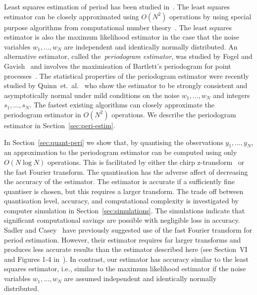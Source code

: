 \documentclass[10pt,twocolumn,twoside]{IEEEtran}
\begin{document}
Least squares estimation of period has been studied in~\cite{Clarkson2007,McKilliam2007,Quinn_sparse_noisy_SSP_2012}.  The least squares estimator can be closely approximated using $O(N^2)$ operations by using special purpose algorithms from computational number theory~\cite{McKilliam2009CoxeterLattices,McKilliam2008,McKilliam2008b}.  The least squares estimator is also the maximum likelihood estimator in the case that the noise variables $w_1,\dots,w_N$ are independent and identically normally distributed.  An alternative estimator, called the~\emph{periodogram estimator}, was studied by Fogel and Gavish~\cite{Fogel1988,Fogel1989_bit_synch_zero_crossings} and involves the maximisation of Bartlett's periodogram for point processes~\cite{Bartlest_periodgram_point_process_1963}.  The statistical properties of the periodogram estimator were recently studied by Quinn~et.~al.~\cite{Quinn20013asilomar_period_est} who show the estimator to be strongly consistent and asymptotically normal under mild conditions on the noise $w_1,\dots,w_N$ and integers $s_1,\dots,s_N$.  The fastest existing algorithms can closely approximate the periodogram estimator in $O(N^2)$ operations.  We describe the periodogram estimator in Section~\ref{sec:peri-estim}.

In Section~\ref{sec:quant-peri} we show that, by quantising the observations $y_1,\dots,y_N$, an approximation to the periodogram estimator can be computed using only $O(N\log N)$ operations.  This is facilitated by either the chirp z-transform~\cite{Rabiner1969} or the fast Fourier transform.  The quantisation has the adverse affect of decreasing the accuracy of the estimator.  The estimator is accurate if a sufficiently fine quantiser is chosen, but this requires a larger transform.  The trade off between quantisation level, accuracy, and computational complexity is investigated by computer simulation in Section~\ref{sec:simulations}.  The simulations indicate that significant computational savings are possible with negligible loss in accuracy.  Sadler and Casey~\cite{726812} have previously suggested use of the fast Fourier transform for period estimation.  However, their estimator requires far larger transforms and produces less accurate results than the estimator described here (see Section~VI and Figures 1-4 in~\cite{726812}).  In contrast, our estimator has accuracy similar to the least squares estimator, i.e., similar to the maximum likelihood estimator if the noise variables $w_1,\dots,w_N$ are assumed independent and identically normally distributed.
 
\end{document}
